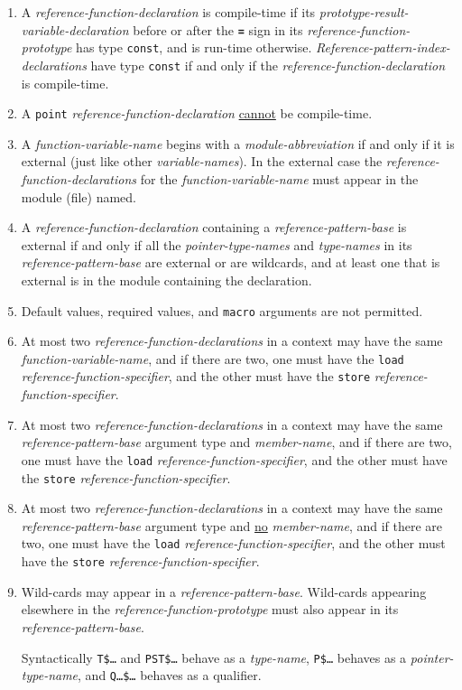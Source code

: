 \documentclass[12pt]{article}
\newcommand{\TT}[1]{{\tt \bfseries #1}}
\begin{document}
\begin{enumerate}
\item
A {\em reference-function-declaration} is compile-time if
its {\em prototype-result-variable-declara\-tion} before or after the
\TT{=} sign in its {\em reference-function-prototype}
has type {\tt const}, and is run-time otherwise.
{\em Reference-pattern-index-declarations} have type {\tt const}
if and only if the {\em reference-function-declaration} is compile-time.
\item
A {\tt point} {\em reference-function-declaration}
\underline{cannot} be compile-time.
\item
A {\em function-variable-name} begins with a {\em module-abbreviation}
if and only if it is external (just like other {\em variable-names}).
In the external case the {\em reference-function-declarations} for the
{\em function-variable-name} must appear in the module (file)
named.
\item
A {\em reference-function-declaration} containing a
{\em reference-pattern-base} is external if and only if
all the {\em pointer-type-names}
and {\em type-names} in its {\em reference-pattern-base} are external or
are wildcards, and at least one that is external is in the
module containing the declaration.
\item
Default values, required values, and {\tt macro} arguments
are not permitted.
\item At most two {\em reference-function-declarations} in a context
may have the same {\em function-variable-name}, and if there are two,
one must have the {\tt load} {\em reference-function-specifier},
and the other must have the {\tt store}
{\em reference-function-specifier}.
\item At most two {\em reference-function-declarations} in a context
may have the same {\em reference-pattern-base} argument type and
{\em member-name}, and if there are two,
one must have the {\tt load} {\em reference-function-specifier},
and the other must have the {\tt store}
{\em reference-function-specifier}.
\item At most two {\em reference-function-declarations} in a context
may have the same {\em reference-pattern-base} argument type and
\underline{no} {\em member-name}, and if there are two,
one must have the {\tt load} {\em reference-function-specifier},
and the other must have the {\tt store}
{\em reference-function-specifier}.
\item
Wild-cards may appear in a {\em reference-pattern-base}.
Wild-cards appearing elsewhere in the {\em reference-function-prototype}
must also appear in its {\em reference-pattern-base}.

Syntactically {\tt T\$\ldots} and {\tt PST\$\ldots} behave as
a {\em type-name},
{\tt P\$\ldots} behaves as a {\em pointer-type-name},
and {\tt Q\ldots\$\ldots} behaves as a qualifier.
\end{enumerate}
\end{document}
